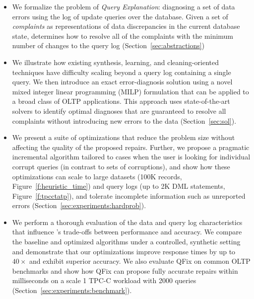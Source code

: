 \begin{itemize}[leftmargin=*, topsep=0mm, itemsep=0mm]

\item We formalize the problem of \emph{Query Explanation}: diagnosing a set of data errors using the log of update queries over the database.  Given a set of \emph{complaints} as representations of data discrepancies in the current database state, \sys determines how to resolve all of the complaints with the minimum number of changes to the query log (Section~\ref{sec:abstractions})

\item We illustrate how existing synthesis, learning, and cleaning-oriented techniques have difficulty scaling beyond a query log containing a single query.   We then introduce an exact error-diagnosis solution using a novel mixed integer linear programming (MILP) formulation that can be applied to a broad class of OLTP applications.  This approach uses state-of-the-art solvers to identify optimal diagnoses that are guaranteed to resolve all complaints without introducing new errors to the data (Section~\ref{sec:sol}).

\item We present a suite of optimizations that reduce the problem size without affecting the quality of the proposed repairs.  Further, we propose a pragmatic incremental algorithm tailored to cases when the user is looking for individual corrupt queries (in contrast to sets of corruptions), and show how these optimizations can scale to large datasets (100K records, Figure~\ref{f:heuristic_time}) and query logs (up to 2K DML statements, Figure~\ref{f:tpcctatp}), and tolerate incomplete information such as unreported errors (Section~\ref{sec:experiments:hardprob}).

\item We perform a thorough evaluation of the data and query log characteristics that influence \sys's trade-offs between performance and accuracy.  We compare the baseline and optimized algorithms under a controlled, synthetic setting and demonstrate that our optimizations improve response times by up to $40\times$ and exhibit superior accuracy.   We also evaluate QFix on common OLTP benchmarks and show how QFix can propose fully accurate repairs within milliseconds on a scale 1 TPC-C workload with 2000 queries (Section~\ref{sec:experiments:benchmark}).

\end{itemize}
